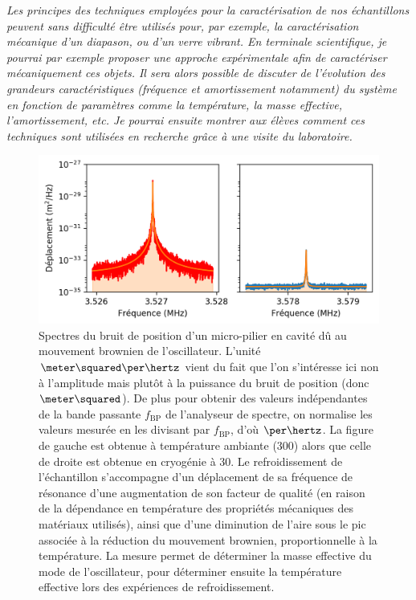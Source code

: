 \documentclass[12pt,a4paper]{article}
\begin{document}
\emph{Les principes des techniques employées pour la caractérisation de nos échantillons peuvent sans difficulté être utilisés pour, par exemple, la caractérisation mécanique d'un diapason, ou d'un verre vibrant.
En terminale scientifique, je pourrai par exemple proposer une approche expérimentale afin de caractériser mécaniquement ces objets.
Il sera alors possible de discuter de l'évolution des grandeurs caractéristiques (fréquence et amortissement notamment) du système en fonction de paramètres comme la température, la masse effective, l'amortissement, etc.
Je pourrai ensuite montrer aux élèves comment ces techniques sont utilisées en recherche grâce à une visite du laboratoire.}
\begin{figure}
\center
\includegraphics[scale=0.75]{figures/thermal_peak_def_filled.png}
\caption{Spectres du bruit de position d'un micro-pilier en cavité dû au mouvement brownien de l'oscillateur.
L'unité $\meter\squared\per\hertz$ vient du fait que l'on s'intéresse ici non à l'amplitude mais plutôt à la puissance du bruit de position (donc $\meter\squared$).
De plus pour obtenir des valeurs indépendantes de la bande passante $f_\mathrm{BP}$ de l'analyseur de spectre, on normalise les valeurs mesurée en les divisant par $f_\mathrm{BP}$, d'où $\per\hertz$.
La figure de gauche est obtenue à température ambiante (\unit{300}{\kelvin}) alors que celle de droite est obtenue en cryogénie à \unit{30}{\milli\kelvin}.
Le refroidissement de l'échantillon s'accompagne d'un déplacement de sa fréquence de résonance d'une augmentation de son facteur de qualité (en raison de la dépendance en température des propriétés mécaniques des matériaux utilisés), ainsi que d'une diminution de l'aire sous le pic associée à la réduction du mouvement brownien, proportionnelle à la température.
La mesure permet de déterminer la masse effective du mode de l'oscillateur, pour déterminer ensuite la température effective lors des expériences de refroidissement.}
\label{fig:thermal_noise}
\end{figure}
\end{document}
